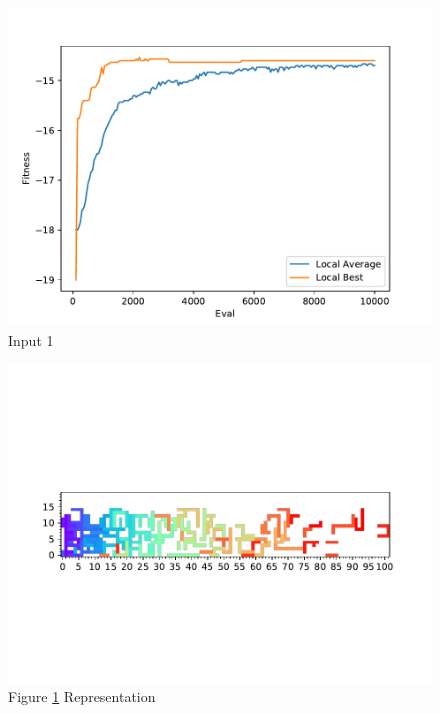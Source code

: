\documentclass{standalone}
\begin{document}
\begin{figure}[!htb]
	\caption{Input 1}
	\label{fig:graph_1008}
	\includegraphics[width=\textwidth]{../graphs/graphs/1008.pdf}
\end{figure}


\begin{figure}[!htb]
	\caption{Figure \ref{fig:graph_1008} Representation}
	\label{fig:picture_1008}
	\includegraphics[width=\textwidth]{../graphs/picture/1008.pdf}
\end{figure}
\end{document}
